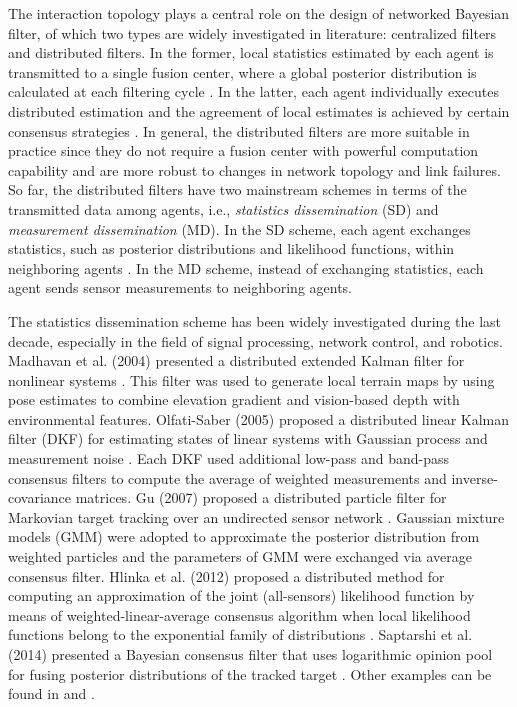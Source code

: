 	The interaction topology \cite{zheng2016stability,zheng2017distributed} plays a central role on the design of networked Bayesian filter, of which two types are widely investigated in literature: centralized filters and distributed filters.
	In the former, local statistics estimated by each agent is transmitted to a single fusion center, where a global posterior distribution is calculated at each filtering cycle \cite{zuo2006bandwidth,vemula2006target}. 
	In the latter, each agent individually executes distributed estimation and the agreement of local estimates is achieved by certain consensus strategies \cite{jadbabaie2003coordination,ren2005consensus,olfati2007consensus}.
	In general, the distributed filters are more suitable in practice since they do not require a fusion center with powerful computation capability and are more robust to changes in network topology and link failures. 
	So far, the distributed filters have two mainstream schemes in terms of the transmitted data among agents, i.e., \textit{statistics dissemination} (SD) and \textit{measurement dissemination} (MD). 
	In the SD scheme, each agent exchanges statistics, such as posterior distributions and likelihood functions, within neighboring agents \cite{hlinka2013distributed}. 
	In the MD scheme, instead of exchanging statistics, each agent sends sensor measurements to neighboring agents. 
	
	The statistics dissemination scheme has been widely investigated during the last decade, especially in the field of signal processing, network control, and robotics.
	Madhavan et al. (2004) presented a distributed extended Kalman filter for nonlinear systems \cite{madhavan2004distributed}. 
	This filter was used to generate local terrain maps by using pose estimates to combine elevation gradient and vision-based depth with environmental features. 
	Olfati-Saber (2005) proposed a distributed linear Kalman filter (DKF) for estimating states of linear systems with Gaussian process and measurement noise \cite{2005distributed}. 
	Each DKF used additional low-pass and band-pass consensus filters to compute the average of weighted measurements and inverse-covariance matrices. 
	Gu (2007) proposed a distributed particle filter for Markovian target tracking over an undirected sensor network \cite{gu2007distributed}. Gaussian mixture models (GMM) were adopted to approximate the posterior distribution from weighted particles and the parameters of GMM were exchanged via average consensus filter. 
	Hlinka et al. (2012) proposed a distributed method for computing an approximation of the joint (all-sensors) likelihood function by means of weighted-linear-average consensus algorithm when local likelihood functions belong to the exponential family of distributions \cite{hlinka2012likelihood}. Saptarshi et al. (2014) presented a Bayesian consensus filter that uses logarithmic opinion pool for fusing posterior distributions of the tracked target \cite{bandyopadhyay2014distributed}. Other examples can be found in \cite{julian2012distributed} and \cite{beaudeau2012target}. 
	
